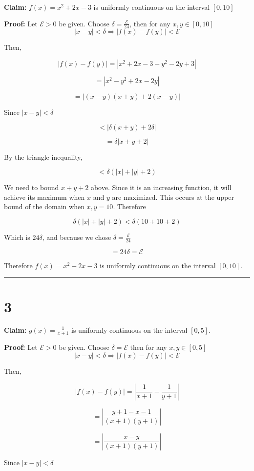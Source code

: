 \documentclass[10pt,letterpaper]{article}
\newcommand\E{\mathcal{E}}
\newcommand\qedsym{\hfill \rule{2mm}{2mm}}
\begin{document}
\textbf{Claim:} $f(x) = x^2 + 2x -3$ is uniformly continuous on the interval $[0,10]$

\medskip

\textbf{Proof:} Let $\E > 0$ be given. Choose $\delta = \frac{\E}{24}$, then for any $x, y \in [0,10]$ \[|x-y| < \delta \Rightarrow |f(x) - f(y)| < \E\]

Then,

\[|f(x)-f(y)| = |x^2 + 2x - 3 - y^2 - 2y + 3|\]

\[= |x^2 - y^2 + 2x - 2y|\]

\[= |(x-y)(x+y) + 2(x-y)|\]

Since $|x-y| < \delta$

\[< |\delta(x+y) + 2\delta|\]

\[= \delta|x + y + 2|\]

By the triangle inequality,

\[< \delta\left(|x| + |y| + 2\right)\]

We need to bound $x + y + 2$ above. Since it is an increasing function, it will achieve its maximum when $x$ and $y$ are maximized. This occurs at the upper bound of the domain when $x,y = 10$. Therefore

\[\delta\left(|x| + |y| + 2\right)<\delta(10+10+2)\]

Which is $24\delta$, and because we chose $\delta=\frac{\E}{24}$

\[=24\delta = \E\]

Therefore $f(x) = x^2 + 2x -3$ is uniformly continuous on the interval $[0,10]$.

\qedsym

\section*{3}

\textbf{Claim:} $g(x) = \frac{1}{x+1}$ is uniformly continuous on the interval $[0,5]$.

\medskip

\textbf{Proof:} Let $\E > 0$ be given. Choose $\delta = \E$ then for any $x, y \in [0,5]$ \[|x-y| < \delta \Rightarrow |f(x) - f(y)| < \E\]

Then,

\[|f(x) - f(y)| = \left|\frac{1}{x+1} - \frac{1}{y+1}\right|\]

\[ = \left|\frac{y+1-x-1}{(x+1)(y+1)}\right|\]

\[ = \left|\frac{x-y}{(x+1)(y+1)}\right|\]

Since $|x-y| < \delta$
\end{document}
